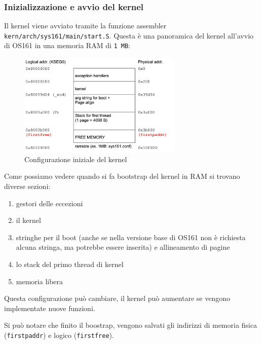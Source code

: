 \subsubsection{Inizializzazione e avvio del kernel}
Il kernel viene avviato tramite la funzione assembler \lstinline{kern/arch/sys161/main/start.S}.
Questa è una panoramica del kernel all'avvio di OS161 in una memoria RAM di \lstinline{1 MB}:
\begin{figure}[hbt!]
    \centering
    \includegraphics[width=0.7\textwidth]{Memoria Virtuale/images/kernel snapshot.png}
    \caption{Configurazione iniziale del kernel}
    \label{kernel_snapshot}
\end{figure}

Come possiamo vedere quando si fa bootstrap del kernel in RAM si trovano diverse sezioni:
\begin{enumerate}
    \item gestori delle eccezioni
    \item il kernel
    \item stringhe per il boot (anche se nella versione base di OS161 non è richiesta alcuna stringa, ma potrebbe essere inserita) e allineamento di pagine 
    \item lo stack del primo thread di kernel
    \item memoria libera
\end{enumerate}
Questa configurazione può cambiare, il kernel può aumentare se vengono implementate nuove funzioni.

Si può notare che finito il boostrap, vengono salvati gli indirizzi di memoria fisica (\lstinline{firstpaddr}) e logico (\lstinline{firstfree}).


